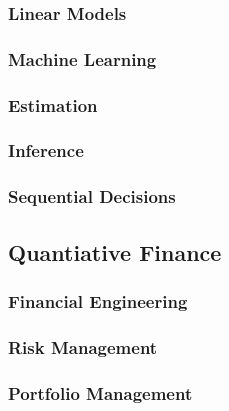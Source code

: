 \documentclass[../main.tex]{subfiles}
\begin{document}
\subsubsection{Linear Models}

\subsubsection{Machine Learning}



\subsubsection{Estimation}

\subsubsection{Inference}

\subsubsection{Sequential Decisions}

\subsection{Quantiative Finance}

\subsubsection{Financial Engineering}

\subsubsection{Risk Management}

\subsubsection{Portfolio Management}
\end{document}
